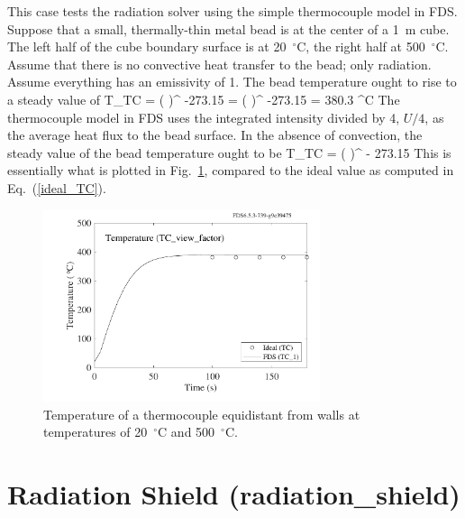 \documentclass[11pt]{book}
\begin{document}
This case tests the radiation solver using the simple thermocouple model in FDS.
Suppose that a small, thermally-thin metal bead is at the center of a 1~m cube. The left half of the cube boundary surface is
at 20~$^\circ$C, the right half at 500~$^\circ$C. Assume that there is no convective heat transfer to the bead; only radiation. Assume everything has an emissivity of 1. The
bead temperature ought to rise to a steady value of
\be
   T_{\hbox{\tiny TC}} = \left(  \right)^ -273.15 = \left(  \right)^ -273.15 = 380.3 \quad ^\circ \hbox{C}
   \label{ideal_TC}
\ee
The thermocouple model in FDS uses the integrated intensity divided by 4, $U/4$, as the average heat flux to the bead surface. In the absence of convection, the steady value of the bead temperature ought to be
\be
   T_{\hbox{\tiny TC}} = \left(  \right)^ - 273.15
\ee
This is essentially what is plotted in Fig.~\ref{TC_view_factor_plot}, compared to the ideal value as computed in Eq.~(\ref{ideal_TC}).
\noindent
\begin{figure}[h]
\begin{center}
\includegraphics[width=3.2in]{SCRIPT_FIGURES/TC_view_factor}
\end{center}
\caption[Radiation/Thermocouple test case.]{Temperature of a thermocouple equidistant from walls at temperatures of 20~$^\circ$C and 500~$^\circ$C.}
\label{TC_view_factor_plot}
\end{figure}

\clearpage

\section{Radiation Shield (\texorpdfstring{{\bf radiation\_shield}}{radiation\_shield}) }
\label{radiation_shield}
\end{document}

